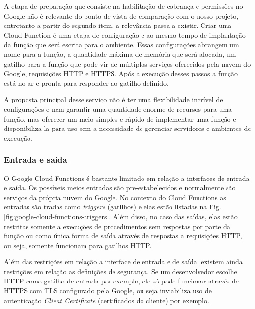 A etapa de preparação que consiste na habilitação de cobrança e permissões no Google não é relevante do ponto de vista de comparação com o nosso projeto, entretanto a partir do segundo item, a relevância passa a existir.
Criar uma Cloud Function é uma etapa de configuração e ao mesmo tempo de implantação da função que será escrita para o ambiente. Essas configurações abrangem um nome para a função, a quantidade máxima de memória que será alocada, um gatilho para a função que pode vir de múltiplos serviços oferecidos pela nuvem do Google, requisições HTTP e HTTPS. Após a execução desses passos a função está no ar e pronta para responder ao gatilho definido.

\bigskip
A proposta principal desse serviço não é ter uma flexibilidade incrível de configurações e nem garantir uma quantidade enorme de recursos para uma função, mas oferecer um meio simples e rápido de implementar uma função e disponibiliza-la para uso sem a necessidade de gerenciar servidores e ambientes de execução.

\subsubsection{Entrada e saída}

O Google Cloud Functions é bastante limitado em relação a interfaces de entrada e saída. Os possíveis meios entradas são pre-estabelecidos e normalmente são serviços da própria nuvem do Google. No contexto do Cloud Functions as entradas são tradas como \textit{triggers} (gatilhos) e elas estão listadas na Fig. \ref{fig:google-cloud-functions-triggers}. Além disso, no caso das saídas, elas estão restritas somente a execuções de procedimentos sem respostas por parte da função ou como única forma de saída através de respostas a requisições HTTP, ou seja, somente funcionam para gatilhos HTTP. 

\bigskip
Além das restrições em relação a interface de entrada e de saída, existem ainda restrições em relação as definições de segurança. Se um desenvolvedor escolhe HTTP como gatilho de entrada por exemplo, ele só pode funcionar através de HTTPS com TLS configurado pela Google, ou seja inviabiliza uso de autenticação \textit{Client Certificate} (certificados do cliente) por exemplo.

